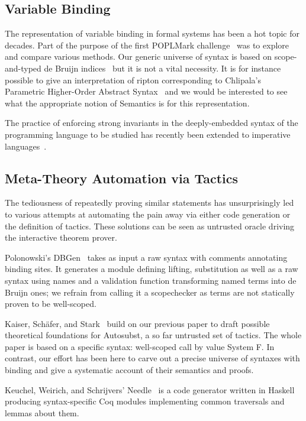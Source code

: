 \subsection{Variable Binding} The representation of variable binding
in formal systems has been a hot topic for decades. Part of the purpose
of the first POPLMark challenge~\citeyear{poplmark} was to explore and
compare various methods. Our generic universe of syntax is based on
scope-and-typed de Bruijn indices~\cite{de1972lambda} but it is not
a vital necessity. It is for instance possible to give an interpretation
of ripton corresponding to Chlipala's Parametric Higher-Order
Abstract Syntax~\citeyear{chlipala2008parametric} and we would be interested
to see what the appropriate notion of Semantics is for this representation.

The practice of enforcing strong invariants in the deeply-embedded syntax
of the programming language to be studied has recently been extended to
imperative languages~\citeyear{BachPoulsen}.

\subsection{Meta-Theory Automation via Tactics} The tediousness of repeatedly
proving similar statements has unsurprisingly led to various attempts at
automating the pain away via either code generation or the definition of
tactics. These solutions can be seen as untrusted oracle driving the
interactive theorem prover.

Polonowski's DBGen~\citeyear{polonowski:db} takes as input a raw syntax with
comments annotating binding sites. It generates a module defining lifting,
substitution as well as a raw syntax using names and a validation function
transforming named terms into de Bruijn ones; we refrain from calling it a
scopechecker as terms are not statically proven to be well-scoped.

Kaiser, Schäfer, and Stark~\citeyear{Kaiser-wsdebr} build on our previous paper
to draft possible theoretical foundations for Autosubst, a so far untrusted
set of tactics. The whole paper is based on a specific syntax: well-scoped
call by value System F. In contrast, our effort has been here to carve out
a precise universe of syntaxes with binding and give a systematic account
of their semantics and proofs.

Keuchel, Weirich, and Schrijvers' Needle~\citeyear{needleandknot} is a code
generator written in Haskell producing syntax-specific Coq modules
implementing common traversals and lemmas about them.

